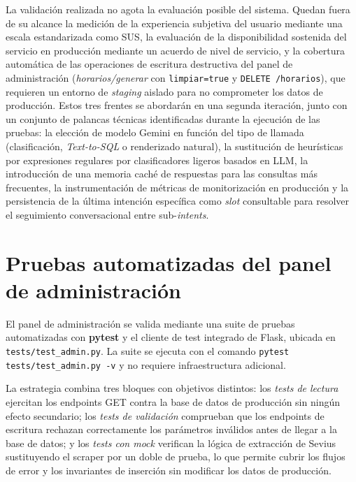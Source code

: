 La validación realizada no agota la evaluación posible del sistema. Quedan fuera de su alcance la medición de la experiencia subjetiva del usuario mediante una escala estandarizada como SUS, la evaluación de la disponibilidad sostenida del servicio en producción mediante un acuerdo de nivel de servicio, y la cobertura automática de las operaciones de escritura destructiva del panel de administración (\textit{horarios/generar} con \texttt{limpiar=true} y \texttt{DELETE /horarios}), que requieren un entorno de \textit{staging} aislado para no comprometer los datos de producción. Estos tres frentes se abordarán en una segunda iteración, junto con un conjunto de palancas técnicas identificadas durante la ejecución de las pruebas: la elección de modelo Gemini en función del tipo de llamada (clasificación, \textit{Text-to-SQL} o renderizado natural), la sustitución de heurísticas por expresiones regulares por clasificadores ligeros basados en LLM, la introducción de una memoria caché de respuestas para las consultas más frecuentes, la instrumentación de métricas de monitorización en producción y la persistencia de la última intención específica como \textit{slot} consultable para resolver el seguimiento conversacional entre sub-\textit{intents}.

\section{Pruebas automatizadas del panel de administración}\label{sec:pruebas-admin}

El panel de administración se valida mediante una suite de pruebas automatizadas con \textbf{pytest} y el cliente de test integrado de Flask, ubicada en \texttt{tests/test\_admin.py}. La suite se ejecuta con el comando \texttt{pytest tests/test\_admin.py -v} y no requiere infraestructura adicional.

La estrategia combina tres bloques con objetivos distintos: los \textit{tests de lectura} ejercitan los endpoints GET contra la base de datos de producción sin ningún efecto secundario; los \textit{tests de validación} comprueban que los endpoints de escritura rechazan correctamente los parámetros inválidos antes de llegar a la base de datos; y los \textit{tests con mock} verifican la lógica de extracción de Sevius sustituyendo el scraper por un doble de prueba, lo que permite cubrir los flujos de error y los invariantes de inserción sin modificar los datos de producción.

